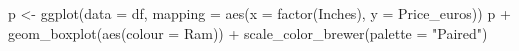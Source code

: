 \documentclass[
  letterpaper,
]{article}
\newenvironment{Shaded}{\begin{snugshade}}{\end{snugshade}}
\newcommand{\AttributeTok}[1]{\textcolor[rgb]{0.40,0.45,0.13}{#1}}
\newcommand{\FunctionTok}[1]{\textcolor[rgb]{0.28,0.35,0.67}{#1}}
\newcommand{\NormalTok}[1]{\textcolor[rgb]{0.00,0.23,0.31}{#1}}
\newcommand{\OtherTok}[1]{\textcolor[rgb]{0.00,0.23,0.31}{#1}}
\newcommand{\SpecialCharTok}[1]{\textcolor[rgb]{0.37,0.37,0.37}{#1}}
\newcommand{\StringTok}[1]{\textcolor[rgb]{0.13,0.47,0.30}{#1}}
\begin{document}
\begin{figure}[H]


\caption{\label{fig-boxplotdefault}}

\end{figure}%

\begin{Shaded}
\begin{Highlighting}[]
\NormalTok{p }\OtherTok{\textless{}{-}} \FunctionTok{ggplot}\NormalTok{(}\AttributeTok{data =}\NormalTok{ df, }\AttributeTok{mapping =} \FunctionTok{aes}\NormalTok{(}\AttributeTok{x =} \FunctionTok{factor}\NormalTok{(Inches), }\AttributeTok{y =}\NormalTok{ Price\_euros))}
\NormalTok{p }\SpecialCharTok{+} \FunctionTok{geom\_boxplot}\NormalTok{(}\FunctionTok{aes}\NormalTok{(}\AttributeTok{colour =}\NormalTok{ Ram)) }\SpecialCharTok{+} \FunctionTok{scale\_color\_brewer}\NormalTok{(}\AttributeTok{palette =} \StringTok{"Paired"}\NormalTok{)}
\end{Highlighting}
\end{Shaded}
\end{document}
